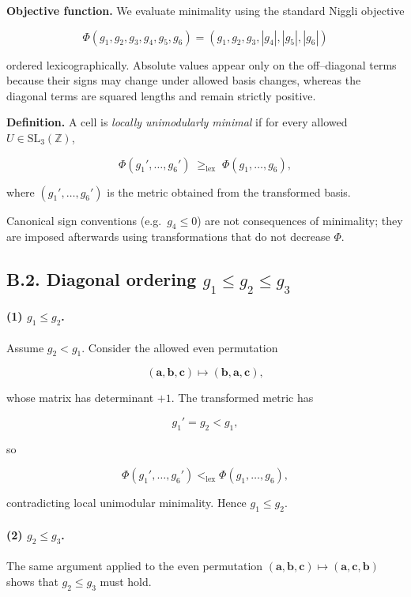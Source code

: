 \documentclass[preprint]{iucr}              %
\numberwithin{equation}{section}
\begin{document}
\noindent
\textbf{Objective function.}
We evaluate minimality using the standard Niggli objective


\[
\Phi(g_1,g_2,g_3,g_4,g_5,g_6)
=
(g_1,g_2,g_3,|g_4|,|g_5|,|g_6|)
\]


ordered lexicographically.  Absolute values appear only on the
off–diagonal terms because their signs may change under allowed basis
changes, whereas the diagonal terms are squared lengths and remain
strictly positive.

\medskip

\noindent
\textbf{Definition.}
A cell is \emph{locally unimodularly minimal} if for every allowed
$U \in \mathrm{SL}_3(\mathbb{Z})$,


\[
\Phi(g_1',\dots,g_6') \;\ge_{\mathrm{lex}}\; \Phi(g_1,\dots,g_6),
\]


where $(g_1',\dots,g_6')$ is the metric obtained from the transformed
basis.

\medskip

\noindent
Canonical sign conventions (e.g.\ $g_4 \le 0$) are not consequences of
minimality; they are imposed afterwards using transformations that do
not decrease $\Phi$.

\subsection*{B.2. Diagonal ordering $g_1 \le g_2 \le g_3$}

\paragraph{(1) $g_1 \le g_2$.}
Assume $g_2 < g_1$.  Consider the allowed even permutation


\[
(\mathbf{a},\mathbf{b},\mathbf{c})
\mapsto
(\mathbf{b},\mathbf{a},\mathbf{c}),
\]


whose matrix has determinant $+1$.  The transformed metric has


\[
g_1' = g_2 < g_1,
\]


so


\[
\Phi(g_1',\dots,g_6') <_{\mathrm{lex}} \Phi(g_1,\dots,g_6),
\]


contradicting local unimodular minimality.  Hence $g_1 \le g_2$.

\paragraph{(2) $g_2 \le g_3$.}
The same argument applied to the even permutation
$(\mathbf{a},\mathbf{b},\mathbf{c}) \mapsto (\mathbf{a},\mathbf{c},\mathbf{b})$
shows that $g_2 \le g_3$ must hold.
\end{document}
